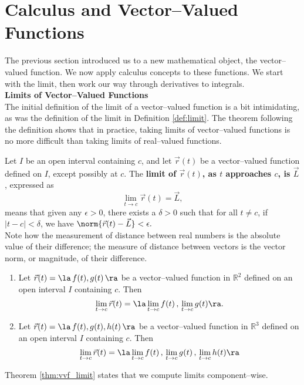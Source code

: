 \section{Calculus and Vector--Valued Functions}\label{sec:vvf_calc}

The previous section introduced us to a new mathematical object, the vector--valued function. We now apply calculus concepts to these functions. We start with the limit, then work our way through derivatives to integrals.\\

\noindent\textbf{\large Limits of Vector--Valued Functions}\\

The initial definition of the limit of a vector--valued function is a bit intimidating, as was the definition of the limit in Definition \ref{def:limit}. The theorem following the definition shows that in practice, taking limits of vector--valued functions is no more difficult than taking limits of real--valued functions.

{Let $I$ be an open interval containing $c$, and let $\vec r(t)$ be a vector--valued function defined on $I$, except possibly at $c$. %
The \textbf{limit of $\vec r(t)$, as $t$ approaches $c$, is $\vec L$}, expressed as 
$$\lim_{t\to c} \vec r(t) = \vec L,$$ means that given any $\epsilon>0$, there exists a $\delta>0$ such that for all $t\neq c$, if $|t-c| <\delta$, we have $\norm{\vec r(t) - \vec L} < \epsilon.$
}\\

Note how the measurement of distance between real numbers is the absolute value of their difference; the measure of distance between vectors is the vector norm, or magnitude, of their difference.
\enlargethispage{2\baselineskip}

{\begin{enumerate}
	\item Let $\vec r(t) = \la \,f(t),g(t)\,\ra$ be a vector--valued function in $\mathbb{R}^2$ defined on an open interval $I$ containing $c$. Then
	$$\lim_{t\to c} \vec r(t) = \la \lim_{t\to c}f(t)\, , \,\lim_{t\to c} g(t)\ra.$$
	\item Let $\vec r(t) = \la \,f(t),g(t),h(t)\,\ra$ be a vector--valued function in $\mathbb{R}^3$ defined on an open interval $I$ containing $c$. Then 
	$$\lim_{t\to c} \vec r(t) = \la \lim_{t\to c}f(t)\, , \,\lim_{t\to c} g(t)\,, \,\lim_{t\to c} h(t)\ra$$
\end{enumerate}
}
Theorem \ref{thm:vvf_limit} states that we compute limits component--wise.\\

